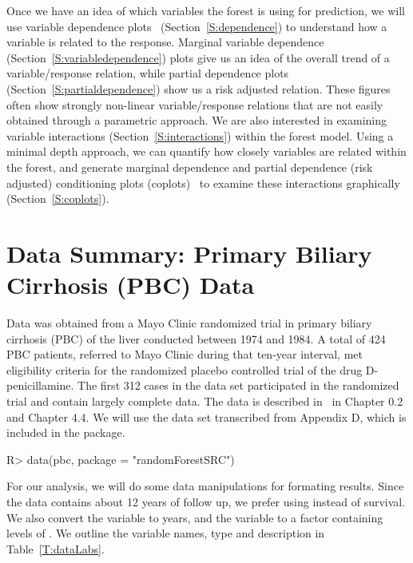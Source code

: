 \documentclass[nojss]{jss}\usepackage[]{graphicx}\usepackage[]{color}
\begin{document}
Once we have an idea of which variables the forest is using for prediction, we will use variable dependence plots~\citep{Friedman:2000} (Section~\ref{S:dependence}) to understand how a variable is related to the response. Marginal variable dependence (Section~\ref{S:variabledependence}) plots give us an idea of the overall trend of a variable/response relation, while partial dependence plots (Section~\ref{S:partialdependence}) show us a risk adjusted relation. These figures often show strongly non-linear variable/response relations that are not easily obtained through a parametric approach. We are also interested in examining variable interactions (Section~\ref{S:interactions}) within the forest model. Using a minimal depth approach, we can quantify how closely variables are related within the forest, and generate marginal dependence and partial dependence (risk adjusted) conditioning plots (coplots)~\citep{chambers:1992,cleveland:1993} to examine these interactions graphically  (Section~\ref{S:coplots}).

\section{Data Summary: Primary Biliary Cirrhosis (PBC) Data}\label{S:data}

Data was obtained from a Mayo Clinic randomized trial in primary biliary cirrhosis (PBC) of the liver conducted between 1974 and 1984. A total of 424 PBC patients, referred to Mayo Clinic during that ten-year interval, met eligibility criteria for the randomized placebo controlled trial of the drug D-penicillamine. The first 312 cases in the data set participated in the randomized trial and contain largely complete data. The data is described in~\cite{fleming:1991} in Chapter 0.2 and Chapter 4.4. We will use the  data set transcribed from Appendix D, which is included in the  package.

\begin{Schunk}
\begin{Sinput}
R> data(pbc, package = "randomForestSRC")
\end{Sinput}
\end{Schunk}



For our analysis, we will do some data manipulations for formating results. Since the data contains about 12 years of follow up, we prefer using  instead of  survival. We also convert the  variable to years, and the  variable to a factor containing levels of . We outline the variable names, type and description in Table~\ref{T:dataLabs}.
\end{document}
